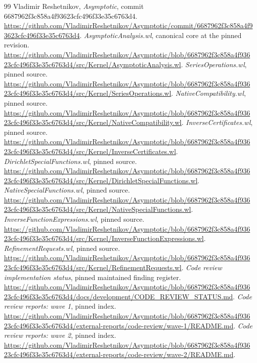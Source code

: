 \documentclass[11pt,letterpaper]{article}
\theoremstyle{definition}\newtheorem{definition}[proposition]{Definition}
\begin{document}
\begin{thebibliography}{99}
\small
{} Vladimir Reshetnikov, \emph{Asymptotic}, commit 6687962f3c858a4f93623cfc496f33e35c6763d4. \url{https://github.com/VladimirReshetnikov/Asymptotic/commit/6687962f3c858a4f93623cfc496f33e35c6763d4}.
 \emph{AsymptoticAnalysis.wl}, canonical core at the pinned revision. \url{https://github.com/VladimirReshetnikov/Asymptotic/blob/6687962f3c858a4f93623cfc496f33e35c6763d4/src/Kernel/AsymptoticAnalysis.wl}.
 \emph{SeriesOperations.wl}, pinned source. \url{https://github.com/VladimirReshetnikov/Asymptotic/blob/6687962f3c858a4f93623cfc496f33e35c6763d4/src/Kernel/SeriesOperations.wl}.
 \emph{NativeCompatibility.wl}, pinned source. \url{https://github.com/VladimirReshetnikov/Asymptotic/blob/6687962f3c858a4f93623cfc496f33e35c6763d4/src/Kernel/NativeCompatibility.wl}.
 \emph{InverseCertificates.wl}, pinned source. \url{https://github.com/VladimirReshetnikov/Asymptotic/blob/6687962f3c858a4f93623cfc496f33e35c6763d4/src/Kernel/InverseCertificates.wl}.
 \emph{DirichletSpecialFunctions.wl}, pinned source. \url{https://github.com/VladimirReshetnikov/Asymptotic/blob/6687962f3c858a4f93623cfc496f33e35c6763d4/src/Kernel/DirichletSpecialFunctions.wl}.
 \emph{NativeSpecialFunctions.wl}, pinned source. \url{https://github.com/VladimirReshetnikov/Asymptotic/blob/6687962f3c858a4f93623cfc496f33e35c6763d4/src/Kernel/NativeSpecialFunctions.wl}.
 \emph{InverseFunctionExpressions.wl}, pinned source. \url{https://github.com/VladimirReshetnikov/Asymptotic/blob/6687962f3c858a4f93623cfc496f33e35c6763d4/src/Kernel/InverseFunctionExpressions.wl}.
 \emph{RefinementRequests.wl}, pinned source. \url{https://github.com/VladimirReshetnikov/Asymptotic/blob/6687962f3c858a4f93623cfc496f33e35c6763d4/src/Kernel/RefinementRequests.wl}.
 \emph{Code review implementation status}, pinned maintained finding register. \url{https://github.com/VladimirReshetnikov/Asymptotic/blob/6687962f3c858a4f93623cfc496f33e35c6763d4/docs/development/CODE_REVIEW_STATUS.md}.
 \emph{Code review reports: wave 1}, pinned index. \url{https://github.com/VladimirReshetnikov/Asymptotic/blob/6687962f3c858a4f93623cfc496f33e35c6763d4/external-reports/code-review/wave-1/README.md}.
 \emph{Code review reports: wave 2}, pinned index. \url{https://github.com/VladimirReshetnikov/Asymptotic/blob/6687962f3c858a4f93623cfc496f33e35c6763d4/external-reports/code-review/wave-2/README.md}.

\end{thebibliography}
\end{document}
